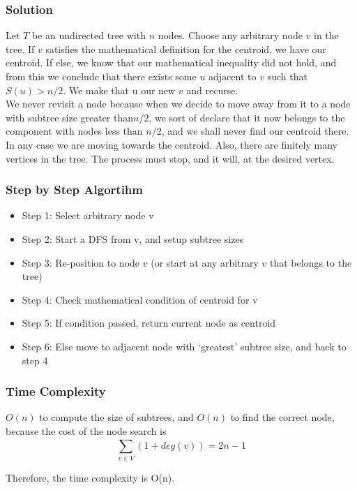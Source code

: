 \documentclass[12pt]{article}
\begin{document}
\subsubsection{Solution}
Let $T$ be an undirected tree with $n$ nodes. Choose any arbitrary node $v$ in the tree. If $v$ satisfies the mathematical definition for the centroid, we have our centroid. If else, we know that our mathematical inequality did not hold, and from this we conclude that there exists some $u$ adjacent to $v$ such that $S(u) > n/2$. We make that u our new $v$ and recurse.\\
We never revisit a node because when we decide to move away from it to a node with subtree size greater than$n/2$, we sort of declare that it now belongs to the component with nodes less than $n/2$, and we shall never find our centroid there.\\
In any case we are moving towards the centroid. Also, there are finitely many vertices in the tree. The process must stop, and it will, at the desired vertex.\cite{9}\\
\subsubsection{Step by Step Algortihm}
\begin{itemize}
    \item Step 1: Select arbitrary node v
    \item Step 2: Start a DFS from v, and setup subtree sizes
    \item Step 3: Re-position to node $v$ (or start at any arbitrary $v$ that belongs to the tree)
    \item Step 4: Check mathematical condition of centroid for v
    \item Step 5: If condition passed, return current node as centroid
    \item Step 6: Else move to adjacent node with ‘greatest’ subtree size, and back to step 4
\end{itemize}
\subsubsection{Time Complexity}
$O(n)$ to compute the size of subtrees, and $O(n)$ to find the correct node,
because the cost of the node search is $$\sum_{v\in V}^{} (1 + deg(v)) = 2n-1$$

Therefore, the time complexity is O(n).
\end{document}
